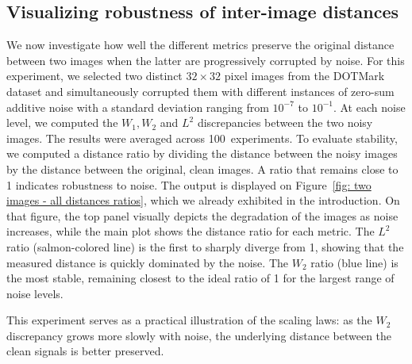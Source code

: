 \documentclass{article}
\theoremstyle{plain}
\theoremstyle{definition}
\theoremstyle{remark}
\begin{document}
\subsection{Visualizing robustness of inter-image distances}\label{subsec: Visualizing Robustness of Inter-Image Distances}

 We now investigate how well the different metrics preserve the original distance between two images when the latter are progressively corrupted by noise.
For this experiment, we selected two distinct $32\times32$ pixel images from the DOTMark dataset and simultaneously corrupted them with different instances of zero-sum additive noise with a standard deviation ranging from $10^{-7}$ to $10^{-1}$. At each noise level, we computed the $W_1,W_2$ and $L^2$ discrepancies between the two noisy images.  The results were averaged across 100~experiments. To evaluate stability, we computed a distance ratio by dividing the distance between the  noisy images by the distance between the original, clean images. A ratio that remains close to 1 indicates robustness to noise.
The output is displayed on Figure~\ref{fig: two images - all distances ratios}, which we already exhibited in the introduction.
On that figure, the top panel visually depicts the degradation of the images as noise increases, while the main plot shows the distance ratio for each metric. 
The $L^2$ ratio (salmon-colored line) is the first to sharply diverge from 1, showing that the measured distance is quickly dominated by the noise. The $W_2$ ratio (blue line) is the most stable, remaining closest to the ideal ratio of 1 for the largest range of noise levels.

This experiment serves as a practical illustration of the scaling laws: as the $W_2$ discrepancy grows more slowly with noise, the underlying distance between the clean signals is better preserved.
\end{document}
